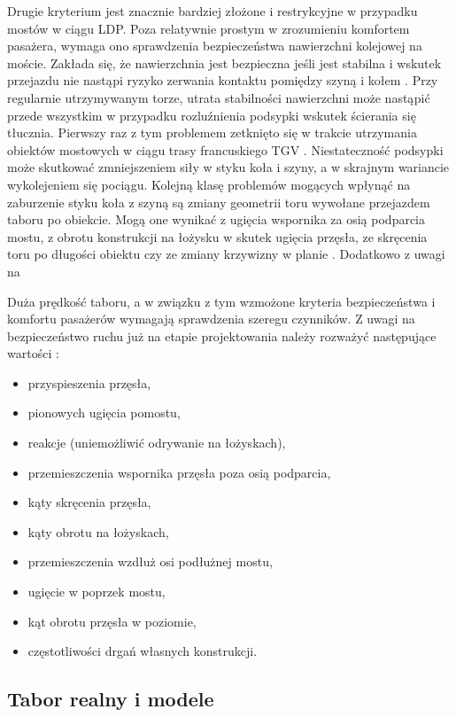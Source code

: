 Drugie kryterium jest znacznie bardziej złożone i restrykcyjne w przypadku mostów w ciągu LDP. Poza relatywnie prostym w zrozumieniu komfortem pasażera, wymaga ono sprawdzenia bezpieczeństwa nawierzchni kolejowej na moście. Zakłada się, że nawierzchnia jest bezpieczna jeśli jest stabilna i wskutek przejazdu nie nastąpi ryzyko zerwania kontaktu pomiędzy szyną i kołem \parencite{Ramondenc2008}. Przy regularnie utrzymywanym torze, utrata stabilności nawierzchni może nastąpić przede wszystkim w przypadku rozluźnienia podsypki wskutek ścierania się tłucznia. Pierwszy raz z tym problemem zetknięto się w trakcie utrzymania obiektów mostowych w ciągu trasy francuskiego TGV \parencite{Ramondenc1998}. Niestateczność podsypki może skutkować zmniejszeniem siły w styku koła i szyny, a w skrajnym wariancie wykolejeniem się pociągu. Kolejną klasę problemów mogących wpłynąć na zaburzenie styku koła z szyną są zmiany geometrii toru wywołane przejazdem taboru po obiekcie. Mogą one wynikać z ugięcia wspornika za osią podparcia mostu, z obrotu konstrukcji na łożysku w skutek ugięcia przęsła, ze skręcenia toru po długości obiektu czy ze zmiany krzywizny w planie \parencite{Niemierko}. Dodatkowo z uwagi na 

Duża prędkość taboru, a w związku z tym wzmożone kryteria bezpieczeństwa i komfortu pasażerów wymagają sprawdzenia szeregu czynników.  Z uwagi na bezpieczeństwo ruchu już na etapie projektowania należy rozważyć następujące wartości \parencite{Niemierko}:
\begin{itemize}[noitemsep]
	\item przyspieszenia przęsła,
	\item pionowych ugięcia pomostu,
	\item reakcje (uniemożliwić odrywanie na łożyskach),
	\item przemieszczenia wspornika przęsła poza osią podparcia,
	\item kąty skręcenia przęsła,
	\item kąty obrotu na łożyskach,
	\item przemieszczenia wzdłuż osi podłużnej mostu,
	\item ugięcie w poprzek mostu,
	\item kąt obrotu przęsła w poziomie,
	\item częstotliwości drgań własnych konstrukcji.
\end{itemize}

\subsection{Tabor realny i modele}
\parencite{J.M.Goicolea-Ruigomez2008}


